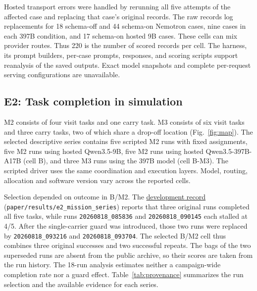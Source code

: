 \documentclass[pdflatex,sn-mathphys-num]{sn-jnl}
\newcommand{\code}[1]{{\def\{{\textnormal{\textbraceleft}}\def\}{\textnormal{\textbraceright}}\texttt{#1}}}
\begin{document}
Hosted transport errors were handled by rerunning all five attempts of the
affected case and replacing that case's original records. The raw records
log replacements for 18 schema-off and 44 schema-on Nemotron cases, nine
cases in each 397B condition, and 17 schema-on hosted 9B cases. These cells
can mix provider routes. Thus 220 is the number of scored records per cell.
The harness, its prompt builders, per-case prompts, responses, and scoring
scripts support reanalysis of the saved outputs. Exact model snapshots and
complete per-request serving configurations are unavailable.

\subsection{E2: Task completion in simulation}
M2 consists of four visit tasks and one carry task. M3 consists of six visit
tasks and three carry tasks, two of which share a drop-off location
(Fig.~\ref{fig:map}). The selected descriptive series contains five scripted
M2 runs with fixed assignments, five M2 runs using hosted Qwen3.5-9B, five
M2 runs using hosted Qwen3.5-397B-A17B (cell B), and three M3 runs using the
397B model (cell B-M3). The scripted driver uses the same coordination and
execution layers. Model, routing, allocation and software version vary
across the reported cells.

Selection depended on outcome in B/M2. The
\href{https://github.com/Innopolis-Robotics-Society/llm_swarm}{development record} (\code{paper/results/e2\_mission\_series})
reports
that three original runs completed all five tasks, while runs
\code{20260818\_085836} and \code{20260818\_090145} each stalled at 4/5.
After the single-carrier guard was introduced, those two runs were
replaced by \code{20260818\_093216} and \code{20260818\_093704}. The selected
B/M2 cell thus combines three original successes and two successful
repeats. The bags of the two superseded runs are absent from the public
archive, so their scores are taken from the run history. The 18-run
analysis estimates neither a campaign-wide completion rate nor a guard
effect. Table~\ref{tab:provenance} summarizes the run selection and the
available evidence for each series.
\end{document}
